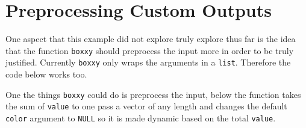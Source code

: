\documentclass[10pt,]{krantz}
\makeatletter
\newenvironment{Shaded}{\begin{snugshade}}{\end{snugshade}}
\newcommand{\CommentTok}[1]{\textcolor[rgb]{0.37,0.37,0.37}{\textit{#1}}}
\newcommand{\ControlFlowTok}[1]{\textcolor[rgb]{0.27,0.27,0.27}{\textbf{#1}}}
\newcommand{\DataTypeTok}[1]{\textcolor[rgb]{0.27,0.27,0.27}{#1}}
\newcommand{\DecValTok}[1]{\textcolor[rgb]{0.06,0.06,0.06}{#1}}
\newcommand{\KeywordTok}[1]{\textcolor[rgb]{0.27,0.27,0.27}{\textbf{#1}}}
\newcommand{\NormalTok}[1]{#1}
\newcommand{\OperatorTok}[1]{\textcolor[rgb]{0.43,0.43,0.43}{\textbf{#1}}}
\newcommand{\OtherTok}[1]{\textcolor[rgb]{0.37,0.37,0.37}{#1}}
\newcommand{\StringTok}[1]{\textcolor[rgb]{0.5,0.5,0.5}{#1}}
\newenvironment{kframe}{%
\medskip{}
\setlength{\fboxsep}{.8em}
 \def\at@end@of@kframe{}%
 \ifinner\ifhmode%
  \def\at@end@of@kframe{\end{minipage}}%
  \begin{minipage}{\columnwidth}%
 \fi\fi%
 \def\FrameCommand##1{\hskip\@totalleftmargin \hskip-\fboxsep
 \colorbox{shadecolor}{##1}\hskip-\fboxsep
     \hskip-\linewidth \hskip-\@totalleftmargin \hskip\columnwidth}%
 \MakeFramed {\advance\hsize-\width
   \@totalleftmargin\z@ \linewidth\hsize
   \@setminipage}}%
 {\par\unskip\endMakeFramed%
 \at@end@of@kframe}
\renewenvironment{Shaded}{\begin{kframe}}{\end{kframe}}
\makeatother
\begin{document}
\hypertarget{shiny-output-preprocess}{%
\section{Preprocessing Custom Outputs}\label{shiny-output-preprocess}}

One aspect that this example did not explore truly explore thus far is the idea that the function \texttt{boxxy} should preprocess the input more in order to be truly justified. Currently \texttt{boxxy} only wraps the arguments in a \texttt{list}. Therefore the code below works too.

\begin{Shaded}
\end{Shaded}

One the things \texttt{boxxy} could do is preprocess the input, below the function takes the sum of \texttt{value} to one pass a vector of any length and changes the default \texttt{color} argument to \texttt{NULL} so it is made dynamic based on the total \texttt{value}.

\begin{Shaded}
\end{Shaded}
\end{document}
